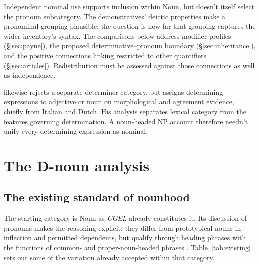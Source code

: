 \documentclass[12pt]{article}
\begin{document}
Independent nominal use supports inclusion within Noun, but doesn't itself select the pronoun subcategory. The demonstratives' deictic properties make a pronominal grouping plausible; the question is how far that grouping captures the wider inventory's syntax. The comparisons below address modifier profiles (§\ref{sec:payne}), the proposed determinative--pronoun boundary (§\ref{sec:inheritance}), and the positive connections linking restricted  to other quantifiers (§\ref{sec:articles}). Redistribution must be assessed against those connections as well as independence.

\textcite{vaneynde2003determiner} likewise rejects a separate determiner category, but assigns determining expressions to adjective or noun on morphological and agreement evidence, chiefly from Italian and Dutch. His analysis separates lexical category from the features governing determination. A noun-headed NP account therefore needn't unify every determining expression as nominal.


\section{The D-noun analysis}\label{sec:proposal}

\subsection{The existing standard of nounhood}\label{sec:membership}

The starting category is Noun as \textit{CGEL} already constitutes it. Its discussion of pronouns makes the reasoning explicit: they differ from prototypical nouns in inflection and permitted dependents, but qualify through heading phrases with the functions of common- and proper-noun-headed phrases \citep[327]{huddleston2002}. Table~\ref{tab:existing} sets out some of the variation already accepted within that category.
\end{document}
